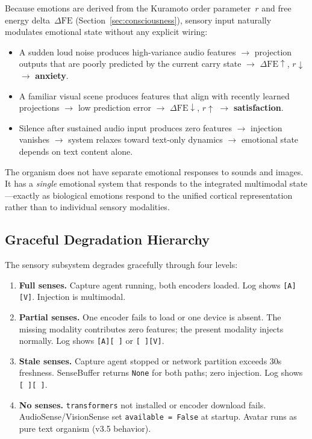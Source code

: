 Because emotions are derived from the Kuramoto order parameter~$r$ and free energy delta~$\Delta\mathrm{FE}$ (Section~\ref{sec:consciousness}), sensory input naturally modulates emotional state without any explicit wiring:

\begin{itemize}
    \item A sudden loud noise produces high-variance audio features $\to$ projection outputs that are poorly predicted by the current carry state $\to$ $\Delta\mathrm{FE} \uparrow$, $r \downarrow$ $\to$ \textbf{anxiety}.
    \item A familiar visual scene produces features that align with recently learned projections $\to$ low prediction error $\to$ $\Delta\mathrm{FE} \downarrow$, $r \uparrow$ $\to$ \textbf{satisfaction}.
    \item Silence after sustained audio input produces zero features $\to$ injection vanishes $\to$ system relaxes toward text-only dynamics $\to$ emotional state depends on text content alone.
\end{itemize}

The organism does not have separate emotional responses to sounds and images.
It has a \emph{single} emotional system that responds to the integrated multimodal state---exactly as biological emotions respond to the unified cortical representation rather than to individual sensory modalities.

\subsection{Graceful Degradation Hierarchy}
\label{sec:degradation}

The sensory subsystem degrades gracefully through four levels:

\begin{enumerate}
    \item \textbf{Full senses.}
        Capture agent running, both encoders loaded.
        Log shows \texttt{[A][V]}.
        Injection is multimodal.
    \item \textbf{Partial senses.}
        One encoder fails to load or one device is absent.
        The missing modality contributes zero features; the present modality injects normally.
        Log shows \texttt{[A][ ]} or \texttt{[ ][V]}.
    \item \textbf{Stale senses.}
        Capture agent stopped or network partition exceeds 30s freshness.
        SenseBuffer returns \texttt{None} for both paths; zero injection.
        Log shows \texttt{[ ][ ]}.
    \item \textbf{No senses.}
        \texttt{transformers} not installed or encoder download fails.
        AudioSense/VisionSense set \texttt{available = False} at startup.
        Avatar runs as pure text organism (v3.5 behavior).
\end{enumerate}

